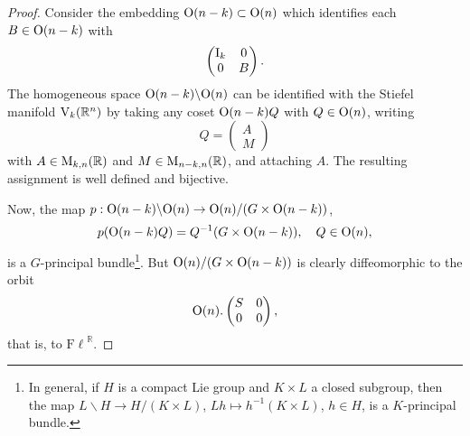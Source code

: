 \documentclass[12pt]{amsart}
\theoremstyle{definition}
\theoremstyle{remark}
\newcommand{\RR}{\mathbb R}
\newcommand{\Fl}{{\mathrm{F\ell}}}
\begin{document}
\begin{proof} 
Consider the embedding ${\rm O}(n-k)\subset {\rm O}(n)$ which identifies each $B\in {\rm O}(n-k)$ with
$$\begin{pmatrix}
{\rm I}_k & 0  \\
0 & B 
\end{pmatrix}. $$
The homogeneous space ${\rm O}(n-k)\backslash {\rm O}(n)$ can be identified with the Stiefel manifold ${\rm V}_k(\RR^n)$ by taking any coset ${\rm O}(n-k)Q$ with $Q\in {\rm O}(n)$, writing
$$Q=\begin{pmatrix}
A  \\
M 
\end{pmatrix}
$$
with $A\in {\rm M}_{k,n}(\RR)$ and $M \in {\rm M}_{n-k, n}(\RR)$, and attaching $A$. The resulting assignment is well defined and bijective.

Now, the map $p: {\rm O}(n-k)\backslash {\rm O}(n) \to {\rm O}(n)/(G \times {\rm O}(n-k))$,
$$p({\rm O}(n-k)Q)=Q^{-1}(G\times {\rm O}(n-k)), \quad Q\in {\rm O}(n),$$
is a $G$-principal bundle\footnote{In general, if $H$ is a compact Lie group and $K\times L$ a closed subgroup, then the map
$L\backslash H \to H/(K\times L)$, $Lh \mapsto h^{-1}(K\times L)$, $h\in H$, is a $K$-principal bundle.}.
But ${\rm O}(n)/(G \times {\rm O}(n-k))$ is clearly diffeomorphic to the orbit
$${\rm O}(n).\begin{pmatrix}
S& 0  \\
0 & 0 
\end{pmatrix},$$
that is, to $\Fl^\RR$. 


\end{proof}
\end{document}
